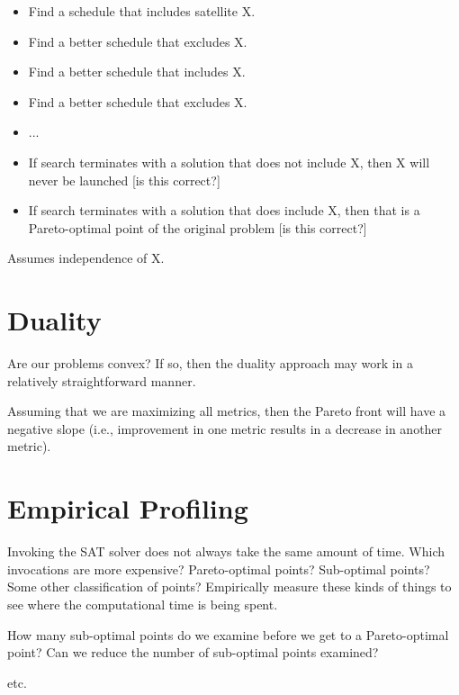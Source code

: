 \documentclass[11pt]{article}
\begin{document}
\begin{itemize}

    \item  Find a schedule that includes satellite X.
    \item  Find a better schedule that excludes X.
    \item  Find a better schedule that includes X.
    \item  Find a better schedule that excludes X.
    \item  ...
    \item  If search terminates with a solution that does not include
    X, then X will never be launched [is this correct?]
    \item  If search terminates with a solution that does include X,
    then that is a Pareto-optimal point of the original problem [is
    this correct?]

\end{itemize}

Assumes independence of X.


\section{Duality}

Are our problems convex?  If so, then the duality approach may work in
a relatively straightforward manner.

Assuming that we are maximizing all metrics, then the Pareto front
will have a negative slope (i.e., improvement in one metric results in
a decrease in another metric).


\section{Empirical Profiling}

Invoking the SAT solver does not always take the same amount of time.
Which invocations are more expensive?  Pareto-optimal points?
Sub-optimal points?  Some other classification of points?  Empirically
measure these kinds of things to see where the computational time is
being spent.

How many sub-optimal points do we examine before we get to a
Pareto-optimal point?  Can we reduce the number of sub-optimal points
examined?

etc.


\end{document}
